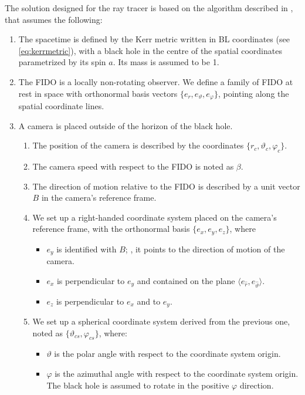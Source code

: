 The solution designed for the ray tracer is based on the algorithm described in \cite{thorne15}, that assumes the following:
\begin{enumerate}
	\item The spacetime is defined by the Kerr metric written in \ac{BL} coordinates (see \autoref{eq:kerrmetric}), with a black hole in the centre of the spatial coordinates parametrized by its spin $a$. Its mass is assumed to be 1.
	\item The \ac{FIDO} is a locally non-rotating observer. We define a family of \ac{FIDO} at rest in space with orthonormal basis vectors $\{e_r, e_\vartheta, e_\varphi\}$, pointing along the spatial coordinate lines.
	\item A camera is placed outside of the horizon of the black hole.
	\begin{enumerate}
		\item The position of the camera is described by the coordinates $\{r_c, \vartheta_c, \varphi_c\}$.
		\item The camera speed with respect to the \ac{FIDO} is noted as $\beta$.
		\item The direction of motion relative to the \ac{FIDO} is described by a unit vector $B$ in the camera's reference frame.
		\item We set up a right-handed coordinate system placed on the camera's reference frame, with the orthonormal basis $\{e_x, e_y, e_z\}$, where
		\begin{itemize}
			\item $e_y$ is identified with $B$; \ie, it points to the direction of motion of the camera.
			\item $e_x$ is perpendicular to $e_y$ and contained on the plane $\langle e_{\widehat{r}}, e_{\widehat{\vartheta}} \rangle$.
			\item $e_z$ is perpendicular to $e_x$ and to $e_y$.
		\end{itemize}
		\item We set up a spherical coordinate system derived from the previous one, noted as $\{\vartheta_{cs}, \varphi_{cs}\}$, where:
		\begin{itemize}
			\item $\vartheta$ is the polar angle with respect to the coordinate system origin.
			\item $\varphi$ is the azimuthal angle with respect to the coordinate system origin. The black hole is assumed to rotate in the positive $\varphi$ direction.
		\end{itemize}
	\end{enumerate}
\end{enumerate}

